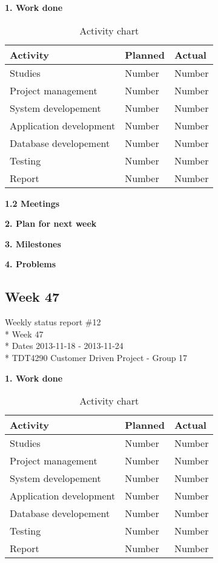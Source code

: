 \textbf{1. Work done}

\begin{table}[H]
\begin{center}
\begin{tabular}{ l | l | l }
  \hline
  Activity & Planned & Actual \\
  \hline\noalign{\smallskip}\noalign{\smallskip}\hline
  Studies & Number & Number \\
  Project management & Number & Number \\
  System developement & Number & Number \\
  Application development & Number & Number \\
  Database developement & Number & Number \\
  Testing & Number & Number \\
  Report & Number & Number \\
  \hline
\end{tabular}
\end{center}
\caption{Activity chart}
\label{table:activityChartStatusReport}
\end{table}

\textbf{1.2 Meetings}

\textbf{2. Plan for next week}

\textbf{3. Milestones}

\textbf{4. Problems}

\newpage
\subsection{Week 47}

\begin{center}
Weekly status report \#12\\*
Week 47 \\*
Dates 2013-11-18 - 2013-11-24 \\*
TDT4290 Customer Driven Project - Group 17
\end{center}

\textbf{1. Work done}

\begin{table}[H]
\begin{center}
\begin{tabular}{ l | l | l }
  \hline
  Activity & Planned & Actual \\
  \hline\noalign{\smallskip}\noalign{\smallskip}\hline
  Studies & Number & Number \\
  Project management & Number & Number \\
  System developement & Number & Number \\
  Application development & Number & Number \\
  Database developement & Number & Number \\
  Testing & Number & Number \\
  Report & Number & Number \\
  \hline
\end{tabular}
\end{center}
\caption{Activity chart}
\label{table:activityChartStatusReport}
\end{table}

